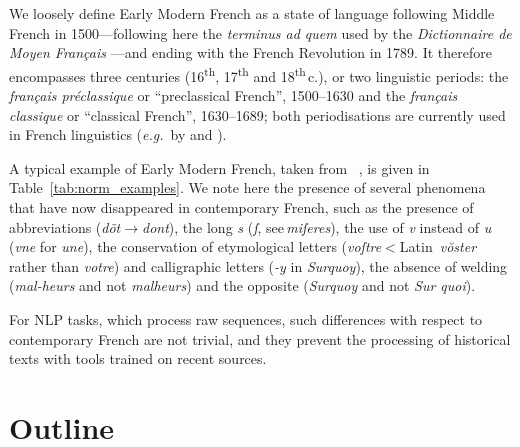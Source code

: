 We loosely define Early Modern French as a state of language following Middle French in 1500---following here the \emph{terminus ad quem} used by the \emph{Dictionnaire de Moyen Français} \cite{martin-2020-dictionnaire}---and ending with the French Revolution in 1789. It therefore encompasses three centuries (16\textsuperscript{th}, 17\textsuperscript{th} and 18\textsuperscript{th}\,c.), or two linguistic periods: the \emph{français préclassique} or ``preclassical French'', 1500--1630 and the \emph{français classique} or ``classical French'', 1630--1689; both periodisations are currently used in French linguistics (\emph{e.g.}~by  and ).

A typical example of Early Modern French, taken from ~, is given in Table~\ref{tab:norm_examples}. We note here the presence of several phenomena that have now disappeared in contemporary French, such as the presence of abbreviations (\emph{dõt}$\to$\emph{dont}), the long \emph{s} (\emph{ſ}, see\,\emph{miſeres}), the use of \emph{v} instead of \emph{u} (\emph{vne} for \emph{une}), the conservation of etymological letters (\emph{voſtre}$<$Latin~\emph{vŏster} rather than \emph{votre}) and calligraphic letters (\emph{-y} in \emph{Surquoy}), the absence of welding  (\emph{\mbox{mal-heurs}} and not \emph{malheurs}) and the opposite (\emph{Surquoy} and not \emph{Sur quoi}).

For NLP tasks, which process raw sequences, such differences with respect to contemporary French are not trivial, and they prevent the processing of historical texts with tools trained on recent sources.

\section{Outline}

